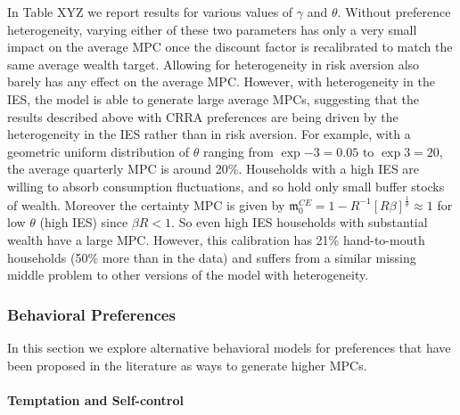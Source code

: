 In Table XYZ we report results for various values of $\gamma$ and $\theta$. Without preference heterogeneity, varying either of these two parameters has only a very small impact on the average MPC once the discount factor is recalibrated to match the same average wealth target. Allowing for heterogeneity in risk aversion also barely has any effect on the average MPC. However, with heterogeneity in the IES, the model is able to generate large average MPCs, suggesting that the results described above with CRRA preferences are being driven by the heterogeneity in the IES rather than in risk aversion. For example, with a geometric uniform distribution of $\theta$ ranging from $\exp{-3}=0.05$ to $\exp{3}=20$, the average quarterly MPC is around 20\%. Households with a high IES are willing to absorb consumption fluctuations, and so hold only small buffer stocks of wealth. Moreover the certainty MPC is given by $\mathfrak{m}_0^{CE}=1-R^{-1}\left[ R\beta \right] ^{\frac{1}{\theta }} \approx 1$ for low $\theta$ (high IES) since $\beta R<1$. So even high IES households with substantial wealth have a large MPC. However, this calibration has 21\% hand-to-mouth households (50\% more than in the data) and suffers from a similar missing middle problem to other versions of the model with heterogeneity. 


\subsubsection{Behavioral Preferences}

In this section we explore alternative behavioral models for preferences that have been proposed in the literature as ways to generate higher MPCs.


\paragraph{Temptation and Self-control}\label{sec:one_asset_temptation}

